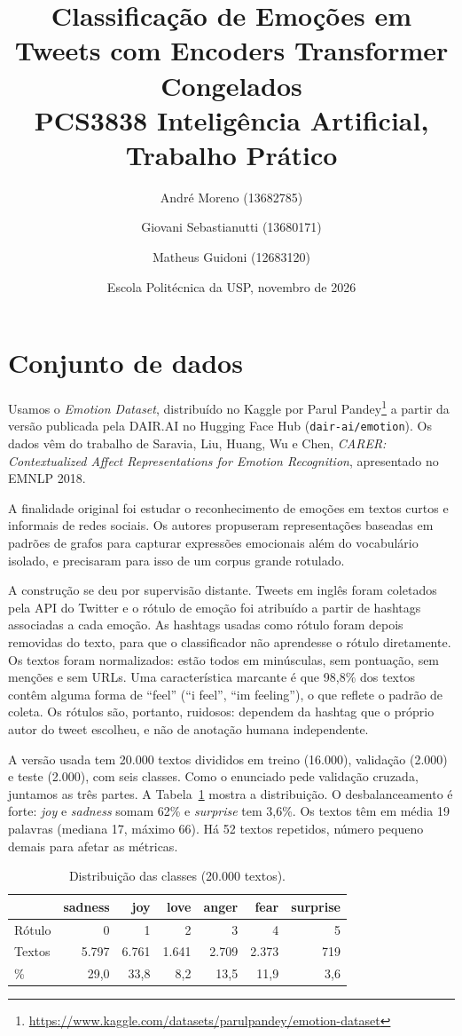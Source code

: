 \documentclass[11pt,a4paper]{article}
\title{\vspace{-1.2cm}Classificação de Emoções em Tweets com Encoders Transformer Congelados\\
\large PCS3838 Inteligência Artificial, Trabalho Prático}
\author{
André Moreno (13682785) \and Giovani Sebastianutti (13680171) \and Matheus Guidoni (12683120)
}
\date{Escola Politécnica da USP, novembro de 2026}
\begin{document}
\maketitle

\section{Conjunto de dados}

Usamos o \textit{Emotion Dataset}, distribuído no Kaggle por Parul Pandey\footnote{\url{https://www.kaggle.com/datasets/parulpandey/emotion-dataset}} a partir da versão publicada pela DAIR.AI no Hugging Face Hub (\texttt{dair-ai/emotion}). Os dados vêm do trabalho de Saravia, Liu, Huang, Wu e Chen, \textit{CARER: Contextualized Affect Representations for Emotion Recognition}, apresentado no EMNLP 2018.

A finalidade original foi estudar o reconhecimento de emoções em textos curtos e informais de redes sociais. Os autores propuseram representações baseadas em padrões de grafos para capturar expressões emocionais além do vocabulário isolado, e precisaram para isso de um corpus grande rotulado.

A construção se deu por supervisão distante. Tweets em inglês foram coletados pela API do Twitter e o rótulo de emoção foi atribuído a partir de hashtags associadas a cada emoção. As hashtags usadas como rótulo foram depois removidas do texto, para que o classificador não aprendesse o rótulo diretamente. Os textos foram normalizados: estão todos em minúsculas, sem pontuação, sem menções e sem URLs. Uma característica marcante é que 98,8\% dos textos contêm alguma forma de ``feel'' (``i feel'', ``im feeling''), o que reflete o padrão de coleta. Os rótulos são, portanto, ruidosos: dependem da hashtag que o próprio autor do tweet escolheu, e não de anotação humana independente.

A versão usada tem 20.000 textos divididos em treino (16.000), validação (2.000) e teste (2.000), com seis classes. Como o enunciado pede validação cruzada, juntamos as três partes. A Tabela~\ref{tab:classes} mostra a distribuição. O desbalanceamento é forte: \textit{joy} e \textit{sadness} somam 62\% e \textit{surprise} tem 3,6\%. Os textos têm em média 19 palavras (mediana 17, máximo 66). Há 52 textos repetidos, número pequeno demais para afetar as métricas.

\begin{table}[H]
\centering
\caption{Distribuição das classes (20.000 textos).}
\label{tab:classes}
\begin{tabular}{lrrrrrr}
\toprule
& sadness & joy & love & anger & fear & surprise \\
\midrule
Rótulo & 0 & 1 & 2 & 3 & 4 & 5 \\
Textos & 5.797 & 6.761 & 1.641 & 2.709 & 2.373 & 719 \\
\% & 29,0 & 33,8 & 8,2 & 13,5 & 11,9 & 3,6 \\
\bottomrule
\end{tabular}
\end{table}
\end{document}
